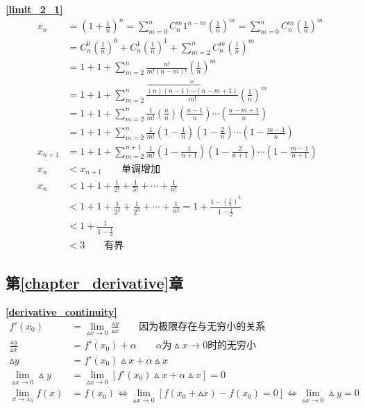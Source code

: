 \textbf{\large \ref{limit_2_1}}
\begin{align*}
        x_n&=\left(1+\frac{1}{n}\right)^n=\sum_{m = 0}^{n} C_n^m 1^{n-m}\left(\frac{1}{n}\right)^m=\sum_{m = 0}^{n} C_n^m \left(\frac{1}{n}\right)^m\\
        &=C_n^0\left(\frac{1}{n}\right)^0+C_n^1\left(\frac{1}{n}\right)^1+ \sum_{m = 2}^{n} C_n^m \left(\frac{1}{n}\right)^m\\
        &=1+1+ \sum_{m = 2}^{n} \frac{n!}{m!\left(n-m\right)!} \left(\frac{1}{n}\right)^m\\
        &=1+1+ \sum_{m = 2}^{n} \frac{\overbrace{\left(n\right)\left(n-1\right)\cdots\left(n-m+1\right)}^{m}}{m!} \left(\frac{1}{n}\right)^m\\
        &=1+1+ \sum_{m = 2}^{n} \frac{1}{m!}\left(\frac{n}{n}\right)\left(\frac{n-1}{n}\right)\cdots\left(\frac{n-m+1}{n}\right) \\
        &=1+1+ \sum_{m = 2}^{n} \frac{1}{m!}\left(1-\frac{1}{n}\right)\left(1-\frac{2}{n}\right)\cdots\left(1-\frac{m-1}{n}\right) \\
        x_{n+1}&=1+1+ \sum_{m = 2}^{n+1} \frac{1}{m!}\left(1-\frac{1}{n+1}\right)\left(1-\frac{2}{n+1}\right)\cdots\left(1-\frac{m-1}{n+1}\right) \\
        x_n&<x_{n+1}\qquad\mbox{单调增加}\\
        x_n&<1+1+\frac{1}{2!}+\frac{1}{3!}+\cdots+\frac{1}{n!}\\
        &<1+1+\frac{1}{2^2}+\frac{1}{2^3}+\cdots+\frac{1}{n^2}=1+\frac{1-\left(\frac{1}{2}\right)^2}{1-\frac{1}{2}}\\
        &<1+\frac{1}{1-\frac{1}{2}}\\
        &<3\qquad \mbox{有界}
\end{align*}

\subsection{\centering 第\ref{chapter_derivative}章}
\textbf{\large \ref{derivative_continuity}}
\begin{align*}
        f'(x_0)&=\lim\limits_{\vartriangle x\to 0}\frac{\vartriangle y}{\vartriangle x}\qquad\mbox{因为极限存在与无穷小的关系}\\
        \frac{\vartriangle y}{\vartriangle x}&=f'(x_0)+\alpha\qquad\alpha \mbox{为}\vartriangle x\to 0\mbox{时的无穷小}\\
        \vartriangle y&=f'(x_0)\vartriangle x+\alpha\vartriangle x\\
        \lim\limits_{\vartriangle x\to 0}\vartriangle y&=\lim\limits_{\vartriangle x\to 0}\left[f'(x_0)\vartriangle x+\alpha\vartriangle x\right]=0\\
        \lim\limits_{x\to x_0}f(x)&=f(x_0)\Leftrightarrow \lim\limits_{\vartriangle x\to 0}\left[f(x_0+\vartriangle x)-f(x_0)=0\right]\Leftrightarrow\lim\limits_{\vartriangle x\to 0}\vartriangle y=0 \\
\end{align*}

